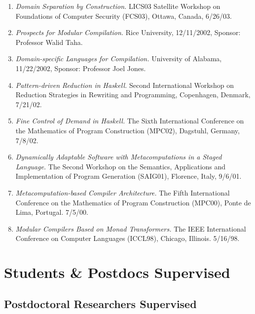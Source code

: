 \documentclass[12pt]{article} %
\begin{document}
\begin{enumerate}[leftmargin=0mm]


\item{\it Domain Separation by Construction.} LICS03 Satellite Workshop on Foundations of Computer Security (FCS03), Ottawa, Canada, 6/26/03. 

\item{\it Prospects for Modular Compilation.}
Rice University, 12/11/2002, Sponsor: Professor Walid Taha.

\item{\it Domain-specific Languages for Compilation.}
University of Alabama, 11/22/2002, Sponsor: Professor Joel Jones.

\item{\it Pattern-driven Reduction in Haskell.} Second International Workshop on Reduction Strategies in Rewriting and Programming, Copenhagen, Denmark, 7/21/02.

\item{\emph{Fine Control of Demand in Haskell.}} The Sixth International Conference on the Mathematics of Program Construction (MPC02), Dagstuhl, Germany, 7/8/02. 

\item{\it Dynamically Adaptable Software with Metacomputations in a Staged Language.} The Second Workshop on the Semantics, Applications and Implementation of Program Generation (SAIG01), Florence, Italy, 9/6/01. 

\item{\it Metacomputation-based Compiler Architecture.} The Fifth International Conference on the Mathematics of Program Construction (MPC00), Ponte de Lima, Portugal. 7/5/00. 

\item{\it Modular Compilers Based on Monad Transformers.} The IEEE International Conference on Computer Languages (ICCL98), Chicago, Illinois. 5/16/98.

\end{enumerate}


\section*{Students \& Postdocs Supervised}
\subsection*{Postdoctoral Researchers Supervised}
\end{document}
